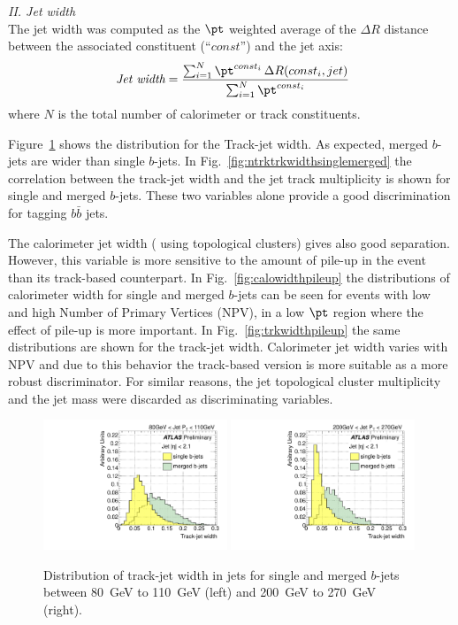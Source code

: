 { \em II. Jet width}
\\[3mm]
 The jet width was computed as the $\pt$ weighted average of the $\Delta R$ distance between the associated constituent (``$const$'') and the jet axis:
\begin{equation} 
\mbox{ {\it Jet width}} = \frac{\sum_{i=1}^N \pt^{const_i} \,\Delta R (const_i,jet) }{\sum_{i=1}^N \pt^{const_i} }
\label{eqn:trackjetwidth}
\end{equation} 
where $N$ is the total number of calorimeter or track constituents.

Figure~\ref{fig:trkwidthsinglemerged} shows the distribution for the Track-jet width. As expected, merged $b$-jets are wider than single $b$-jets. In Fig.~\ref{fig:ntrktrkwidthsinglemerged} the correlation between the track-jet width and the jet track multiplicity is shown for single and merged $b$-jets. These two variables alone provide a good discrimination for tagging $b \bar{b}$ jets.

The calorimeter jet width ( using topological clusters) gives also good separation. However, this variable is more sensitive to the amount of pile-up in the event than its track-based counterpart. In Fig.~\ref{fig:calowidthpileup} the distributions of calorimeter width for single and merged $b$-jets  can be seen for events with low and high Number of Primary Vertices (NPV), in a low $\pt$ region where the effect of pile-up is more important. In Fig.~\ref{fig:trkwidthpileup} the same distributions are shown for the track-jet width. Calorimeter jet width varies %
with NPV and due to this behavior the track-based version is more suitable as a more robust discriminator. For similar reasons, the jet topological cluster multiplicity and the jet mass were discarded as discriminating variables.
\\[3mm]

\begin{figure}[tp]
\centering
\includegraphics[width=0.49\textwidth]{FIGS/VarsSingleMerged/trkWidth080.pdf}
\includegraphics[width=0.49\textwidth]{FIGS/VarsSingleMerged/trkWidth200.pdf}
\caption{Distribution of track-jet width in jets for single and merged $b$-jets between 80~GeV to 110~GeV (left) and 200~GeV to 270~GeV (right).}
\label{fig:trkwidthsinglemerged}
\end{figure}

